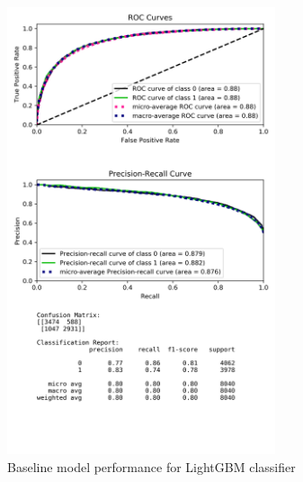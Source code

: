 \documentclass[journal,twoside,web]{ieeecolor}
\begin{document}
\begin{figure}[h!]
  \centering
  \includegraphics[width=3.1in]{project/code/preliminary-lightGBM-downsampled.png}
  \caption{Baseline model performance for LightGBM classifier}
  \label{fig:prelim-lgbm}
\end{figure}





\nocite{*}


\end{document}
